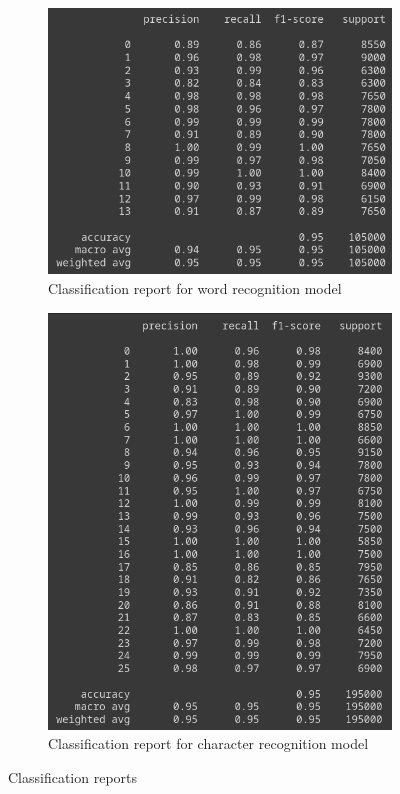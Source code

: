 \begin{figure}[h]
	\centering
	\begin{subfigure}[b]{0.7\textwidth}
		\includegraphics[width=\linewidth]{images/classification_report_words}
		\caption{Classification report for word recognition model}
		\label{fig:words_classification_report}
	\end{subfigure}
	\begin{subfigure}[b]{0.7\textwidth}
		\includegraphics[width=\linewidth]{images/classification_report_characters}
		\caption{Classification report for character recognition model}
		\label{fig:characters_classification_report}
	\end{subfigure}
	\caption{Classification reports}
	\label{fig:classification_reports}
\end{figure}